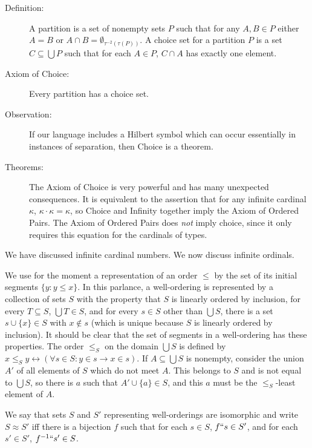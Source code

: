 \documentclass[12pt]{article}
\begin{document}
\begin{description}

\item[Definition:]  A partition is a set of nonempty sets $P$ such that for any $A,B \in P$ either $A=B$ or $A \cap B = \emptyset_{\tau^{-2}(\tau(P))}$.  A choice set for a partition $P$ is a set $C \subseteq \bigcup P$ such that for each $A \in P$, $C \cap A$ has exactly one element.

\item[Axiom of Choice:]  Every partition has a choice set.

\item[Observation:]  If our language includes a Hilbert symbol which can occur essentially in instances of separation, then Choice is a theorem.

\item[Theorems:]  The Axiom of Choice is very powerful and has many unexpected consequences.  It is equivalent to the assertion that for any infinite cardinal $\kappa$, $\kappa\cdot \kappa = \kappa$, so Choice and Infinity together imply the Axiom of Ordered Pairs.  The Axiom of Ordered Pairs does {\em not\/} imply choice, since it only requires this equation for the cardinals of types.

\end{description}



We have discussed infinite cardinal numbers.  We now discuss infinite ordinals. 

We use for the moment a representation of an order $\leq$ by the set of its initial segments $\{y:y \leq x\}$.  In this parlance, a well-ordering is represented by a collection of sets $S$ with the property that $S$ is linearly ordered by inclusion, for every $T \subseteq S$, $\bigcup T \in S$, and for every $s \in S$ other than $\bigcup S$, there is a set $s \cup \{x\} \in S$ with $x \not\in s$ (which is unique because $S$ is linearly ordered by inclusion).  It should be clear that the set of segments in a well-ordering has these properties.  The order $\leq_S$ on the domain $\bigcup S$ is defined by $x \leq_S y \leftrightarrow (\forall s \in S:y \in s \rightarrow x \in s)$.  If $A \subseteq \bigcup S$ is nonempty, consider the union $A'$ of all elements of $S$ which do not meet $A$.  This belongs to $S$ and is not equal to $\bigcup S$, so there is $a$ such that $A' \cup \{a\} \in S$, and this $a$ must be the $\leq_S$-least element of $A$.

We say that sets $S$ and $S'$ representing well-orderings are isomorphic and write $S \approx S'$ iff there is a bijection $f$ such that for each $s \in S$, $f``s \in S'$, and for each $s' \in S'$, $f^{-1}``s' \in S$.
\end{document}
